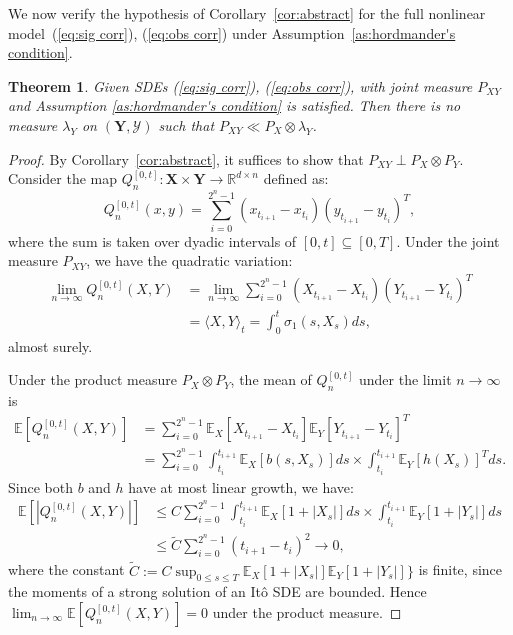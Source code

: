 \documentclass[12pt]{amsart}
\newtheorem{theorem}{Theorem}[section]
\theoremstyle{definition}
\theoremstyle{remark}
\newcommand{\ms}[1]{(\mathbf{#1},\mathcal{#1})}
\begin{document}
We now verify the hypothesis of Corollary~\ref{cor:abstract} for the full nonlinear model~(\ref{eq:sig corr}), (\ref{eq:obs corr}) under Assumption~\ref{as:hordmander's condition}.

\begin{theorem}
    Given SDEs (\ref{eq:sig corr}), (\ref{eq:obs corr}), with joint measure $P_{XY}$ and Assumption \ref{as:hordmander's condition} is satisfied. Then there is no measure $\lambda_Y$ on $\ms{Y}$ such that $P_{XY}\ll P_X\otimes \lambda_Y$.
\end{theorem}
\begin{proof}
    By Corollary~\ref{cor:abstract}, it suffices to show that $P_{XY} \perp P_X\otimes P_Y$. Consider the map $Q_n^{[0,t]}:\mathbf{X}\times\mathbf{Y}\to \mathbb{R}^{d\times n}$ defined as:
    \begin{equation}
        Q_n^{[0,t]}(x,y) = \sum_{i=0}^{2^n-1}(x_{t_{i+1}}-x_{t_i})(y_{t_{i+1}}-y_{t_i})^T,
    \end{equation}
    where the sum is taken over dyadic intervals of $[0,t]\subseteq[0,T]$.
    Under the joint measure $P_{XY}$, we have the quadratic variation:
    \begin{align*}
        \lim_{n\to\infty}Q_n^{[0,t]}(X,Y)  &= \lim_{n\to\infty}\sum_{i=0}^{2^n-1}(X_{t_{i+1}}-X_{t_i})(Y_{t_{i+1}}-Y_{t_i})^T\\
        &= \langle X,Y\rangle_t = \int_0^t\sigma_1(s,X_s)ds,
    \end{align*}
    almost surely.

    Under the product measure $P_X\otimes P_Y$, the mean of $Q_n^{[0,t]}$ under the limit $n\to\infty$ is
    \begin{align*}
        \mathbb{E}[Q_n^{[0,t]}(X,Y)] &= \sum_{i=0}^{2^n-1} \mathbb{E}_X[X_{t_{i+1}}-X_{t_i}]\mathbb{E}_Y[Y_{t_{i+1}}-Y_{t_i}]^T \\
         &= \sum_{i=0}^{2^n-1}\int_{t_i}^{t_{i+1}}\mathbb{E}_X\left[b(s,X_s)\right]ds\times\int_{t_i}^{t_{i+1}}\mathbb{E}_Y\left[h(X_s)\right]^Tds.
    \end{align*}
    Since both $b$ and $h$ have at most linear growth, we have:
    \begin{align*}
        \mathbb{E}[|Q_n^{[0,t]}(X,Y)|] &\leq C\sum_{i=0}^{2^n-1}\int_{t_i}^{t_{i+1}}\mathbb{E}_X[1+|X_s|]ds\times\int_{t_i}^{t_{i+1}}\mathbb{E}_Y[1+|Y_s|]ds\\
        &\leq \tilde{C}\sum_{i=0}^{2^n-1}(t_{i+1}-t_i)^2\to0,
    \end{align*}
    where the constant $\tilde{C} := C\sup_{0\leq s\leq T}\mathbb{E}_X[1+|X_s|]\mathbb{E}_Y[1+|Y_s|]\}$ is finite, since the moments of a strong solution of an It\^o SDE are bounded. Hence $\lim_{n\to\infty}\mathbb{E}[Q_n^{[0,t]}(X,Y)] = 0$ under the product measure.


\end{proof}
\end{document}
